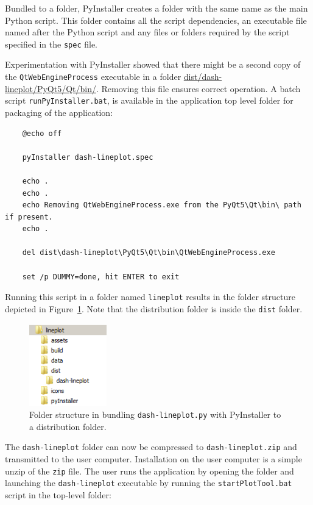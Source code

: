 Bundled to a folder, PyInstaller creates a folder with the same name as the main Python script. This folder contains all the script dependencies, an executable file named after the Python script and any files or folders required by the script specified in the \texttt{spec} file.

Experimentation with PyInstaller showed that there might be a second copy of the \texttt{QtWebEngineProcess} executable in a folder \url{dist/dash-lineplot/PyQt5/Qt/bin/}. Removing this file ensures correct operation. A batch script \texttt{runPyInstaller.bat}, is available in the application top level folder for packaging of the application:

\footnotesize
\begin{lstlisting}
    @echo off

    pyInstaller dash-lineplot.spec

    echo .
    echo .
    echo Removing QtWebEngineProcess.exe from the PyQt5\Qt\bin\ path if present.
    echo .

    del dist\dash-lineplot\PyQt5\Qt\bin\QtWebEngineProcess.exe

    set /p DUMMY=done, hit ENTER to exit

\end{lstlisting}
\normalsize


Running this script in a folder named \texttt{lineplot} results in the folder structure depicted in Figure~\ref{fig:folderdist}. Note that the distribution folder is inside the \texttt{dist} folder.


\begin{figure}[h]
\centering
\includegraphics[width=0.3\textwidth]{pic/folderDist}
\caption{Folder structure in bundling \texttt{dash-lineplot.py} with PyInstaller to a distribution folder.
\label{fig:folderdist}}
\end{figure}


The \texttt{dash-lineplot} folder can now be compressed to \texttt{dash-lineplot.zip} and transmitted to the user computer. Installation on the user computer is a simple unzip of the \texttt{zip} file. The user runs the application by opening the folder and launching the \texttt{dash-lineplot} executable by running the \texttt{startPlotTool.bat} script in the top-level folder:

